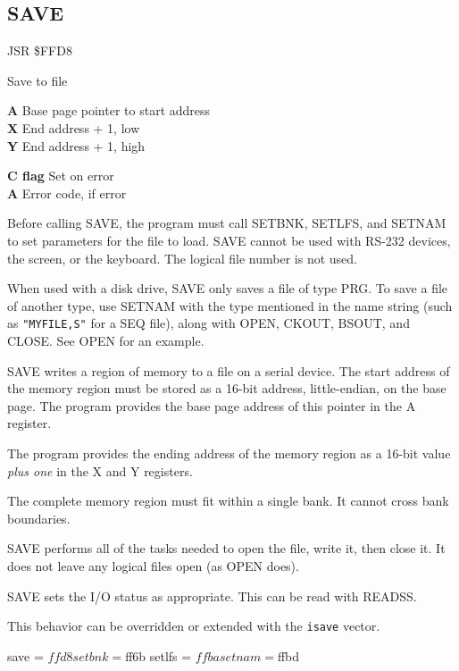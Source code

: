 
\newpage
\subsection{SAVE}
\label{KERNAL Jump Table!SAVE}
\begin{description}[leftmargin=2cm,style=nextline]
    \item [Address:] JSR \$FFD8
    \item [Description:] Save to file
    \item [Inputs:]
        \textbf{A} Base page pointer to start address \\
        \textbf{X} End address + 1, low \\
        \textbf{Y} End address + 1, high
    \item [Outputs:]
        \textbf{C flag} Set on error \\
        \textbf{A} Error code, if error
    \item [Remarks:]
        Before calling SAVE, the program must call SETBNK, SETLFS, and SETNAM to set parameters for the file to load. SAVE cannot be used with RS-232 devices, the screen, or the keyboard. The logical file number is not used.

        When used with a disk drive, SAVE only saves a file of type PRG. To save a file of another type, use SETNAM with the type mentioned in the name string (such as \texttt{"MYFILE,S"} for a SEQ file), along with OPEN, CKOUT, BSOUT, and CLOSE. See OPEN for an example.

        SAVE writes a region of memory to a file on a serial device. The start address of the memory region must be stored as a 16-bit address, little-endian, on the base page. The program provides the base page address of this pointer in the A register.

        The program provides the ending address of the memory region as a 16-bit value \emph{plus one} in the X and Y registers.

        The complete memory region must fit within a single bank. It cannot cross bank boundaries.

        SAVE performs all of the tasks needed to open the file, write it, then close it. It does not leave any logical files open (as OPEN does).

        SAVE sets the I/O status as appropriate. This can be read with READSS.

        This behavior can be overridden or extended with the \texttt{isave} vector.
    \item [Example:]
        \begin{asmcode}
save = $ffd8
setbnk = $ff6b
setlfs = $ffba
setnam = $ffbd


\end{asmcode}
\end{description}
